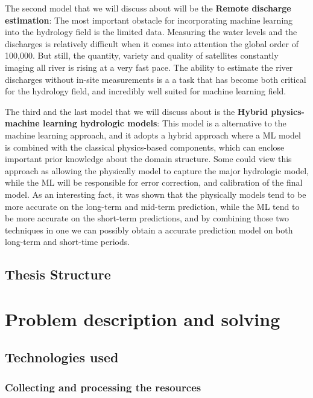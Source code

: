 \documentclass[12pt, a4paper]{report}
\begin{document}
The second model that we will discuss about will be the \textbf{Remote discharge estimation}: The most important obstacle for incorporating machine learning into the hydrology field is the limited data. Measuring the water levels and the discharges is relatively difficult when it comes into attention the global order of 100,000. But still, the quantity, variety and quality of satellites constantly imaging all river is rising at a very fast pace. The ability to estimate the river discharges without in-site measurements is a a task that has become both critical for the hydrology field, and incredibly well suited for machine learning field.
\par 

The third and the last model that we will discuss about is the \textbf{Hybrid physics-machine learning hydrologic models}: This model is a alternative to the machine learning approach, and it adopts a hybrid approach where a ML model is combined with the classical physics-based components, which can enclose important prior knowledge about the domain structure. Some could view this approach as allowing the physically model to capture the major hydrologic  model, while the ML will be responsible for error correction, and calibration of the final model. As an interesting fact, it was shown that the physically models tend to be more accurate on the long-term and mid-term prediction, while the ML tend to be more accurate on the short-term predictions, and by combining those two techniques in one we can possibly obtain a accurate prediction model on both long-term and short-time periods.



\section{Thesis Structure}



\newpage{}


\chapter{Problem description and solving}

\section{Technologies used}

\subsection{Collecting and processing the resources}
\end{document}
